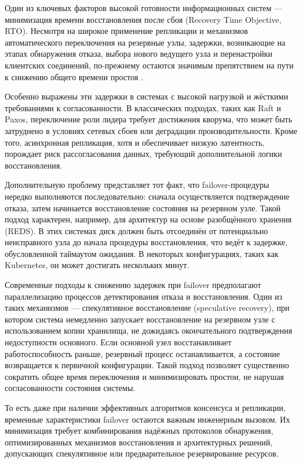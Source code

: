Один из ключевых факторов высокой готовности информационных систем — минимизация времени восстановления после сбоя (Recovery Time Objective, RTO). Несмотря на широкое применение репликации и механизмов автоматического переключения на резервные узлы, задержки, возникающие на этапах обнаружения отказа, выбора нового ведущего узла и перенастройки клиентских соединений, по-прежнему остаются значимым препятствием на пути к снижению общего времени простоя \autocite{USENIXLi}.

Особенно выражены эти задержки в системах с высокой нагрузкой и жёсткими требованиями к согласованности. В классических подходах, таких как Raft и Paxos, переключение роли лидера требует достижения кворума, что может быть затруднено в условиях сетевых сбоев или деградации производительности. Кроме того, асинхронная репликация, хотя и обеспечивает низкую латентность, порождает риск рассогласования данных, требующий дополнительной логики восстановления.

Дополнительную проблему представляет тот факт, что failover-процедуры нередко выполняются последовательно: сначала осуществляется подтверждение отказа, затем начинается восстановление состояния на резервном узле. Такой подход характерен, например, для архитектур на основе разобщённого хранения (REDS). В этих системах диск должен быть отсоединён от потенциально неисправного узла до начала процедуры восстановления, что ведёт к задержке, обусловленной таймаутом ожидания. В некоторых конфигурациях, таких как Kubernetes, он может достигать нескольких минут.

Современные подходы к снижению задержек при failover предполагают параллелизацию процессов детектирования отказа и восстановления. Один из таких механизмов — спекулятивное восстановление (speculative recovery), при котором система немедленно запускает восстановление на резервном узле с использованием копии хранилища, не дожидаясь окончательного подтверждения недоступности основного. Если основной узел восстанавливает работоспособность раньше, резервный процесс останавливается, а состояние возвращается к первичной конфигурации. Такой подход позволяет существенно сократить общее время переключения и минимизировать простои, не нарушая согласованности состояния системы.

То есть даже при наличии эффективных алгоритмов консенсуса и репликации, временные характеристики failover остаются важным инженерным вызовом. Их минимизация требует комбинирования надёжных протоколов обнаружения, оптимизированных механизмов восстановления и архитектурных решений, допускающих спекулятивное или предварительное резервирование ресурсов.

